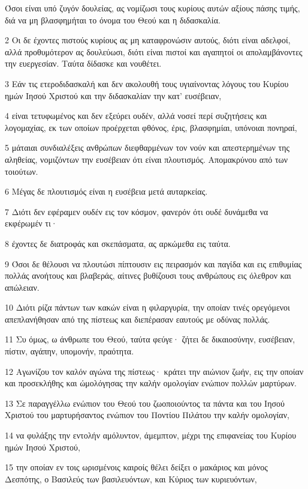 \par Όσοι είναι υπό ζυγόν δουλείας, ας νομίζωσι τους κυρίους αυτών αξίους πάσης τιμής, διά να μη βλασφημήται το όνομα του Θεού και η διδασκαλία.
\par 2 Οι δε έχοντες πιστούς κυρίους ας μη καταφρονώσιν αυτούς, διότι είναι αδελφοί, αλλά προθυμότερον ας δουλεύωσι, διότι είναι πιστοί και αγαπητοί οι απολαμβάνοντες την ευεργεσίαν. Ταύτα δίδασκε και νουθέτει.
\par 3 Εάν τις ετεροδιδασκαλή και δεν ακολουθή τους υγιαίνοντας λόγους του Κυρίου ημών Ιησού Χριστού και την διδασκαλίαν την κατ' ευσέβειαν,
\par 4 είναι τετυφωμένος και δεν εξεύρει ουδέν, αλλά νοσεί περί συζητήσεις και λογομαχίας, εκ των οποίων προέρχεται φθόνος, έρις, βλασφημίαι, υπόνοιαι πονηραί,
\par 5 μάταιαι συνδιαλέξεις ανθρώπων διεφθαρμένων τον νούν και απεστερημένων της αληθείας, νομιζόντων την ευσέβειαν ότι είναι πλουτισμός. Απομακρύνου από των τοιούτων.
\par 6 Μέγας δε πλουτισμός είναι η ευσέβεια μετά αυταρκείας.
\par 7 Διότι δεν εφέραμεν ουδέν εις τον κόσμον, φανερόν ότι ουδέ δυνάμεθα να εκφέρωμέν τι·
\par 8 έχοντες δε διατροφάς και σκεπάσματα, ας αρκώμεθα εις ταύτα.
\par 9 Όσοι δε θέλουσι να πλουτώσι πίπτουσιν εις πειρασμόν και παγίδα και εις επιθυμίας πολλάς ανοήτους και βλαβεράς, αίτινες βυθίζουσι τους ανθρώπους εις όλεθρον και απώλειαν.
\par 10 Διότι ρίζα πάντων των κακών είναι η φιλαργυρία, την οποίαν τινές ορεγόμενοι απεπλανήθησαν από της πίστεως και διεπέρασαν εαυτούς με οδύνας πολλάς.
\par 11 Συ όμως, ω άνθρωπε του Θεού, ταύτα φεύγε· ζήτει δε δικαιοσύνην, ευσέβειαν, πίστιν, αγάπην, υπομονήν, πραότητα.
\par 12 Αγωνίζου τον καλόν αγώνα της πίστεως· κράτει την αιώνιον ζωήν, εις την οποίαν και προσεκλήθης και ώμολόγησας την καλήν ομολογίαν ενώπιον πολλών μαρτύρων.
\par 13 Σε παραγγέλλω ενώπιον του Θεού του ζωοποιούντος τα πάντα και του Ιησού Χριστού του μαρτυρήσαντος ενώπιον του Ποντίου Πιλάτου την καλήν ομολογίαν,
\par 14 να φυλάξης την εντολήν αμόλυντον, άμεμπτον, μέχρι της επιφανείας του Κυρίου ημών Ιησού Χριστού,
\par 15 την οποίαν εν τοις ωρισμένοις καιροίς θέλει δείξει ο μακάριος και μόνος Δεσπότης, ο Βασιλεύς των βασιλευόντων, και Κύριος των κυριευόντων,
